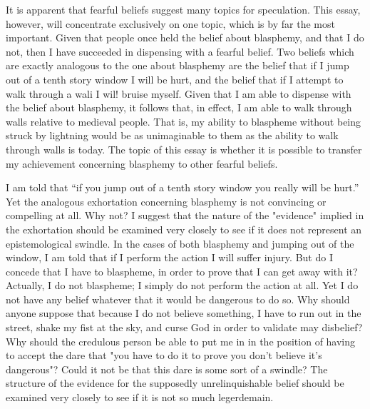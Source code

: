 \documentclass[10pt,twoside,draft]{memoir}
\begin{document}
It is apparent that fearful beliefs suggest many topics for speculation. 
This essay, however, will concentrate exclusively on one topic, which is by 
far the most important. Given that people once held the belief about 
blasphemy, and that I do not, then I have succeeded in dispensing with a 
fearful belief. Two beliefs which are exactly analogous to the one about 
blasphemy are the belief that if I jump out of a tenth story window I will be 
hurt, and the belief that if I attempt to walk through a wali I wil! bruise 
myself. Given that I am able to dispense with the belief about blasphemy, it 
follows that, in effect, I am able to walk through walls relative to medieval 
people. That is, my ability to blaspheme without being struck by lightning 
would be as unimaginable to them as the ability to walk through walls is 
today. The topic of this essay is whether it is possible to transfer my 
achievement concerning blasphemy to other fearful beliefs. 

\visbreak

I am told that \enquote{if you jump out of a tenth story window you really will 
be hurt.} Yet the analogous exhortation concerning blasphemy is not 
convincing or compelling at all. Why not? I suggest that the nature of the 
"evidence" implied in the exhortation should be examined very closely to 
see if it does not represent an epistemological swindle. In the cases of both 
blasphemy and jumping out of the window, I am told that if I perform the 
action I will suffer injury. But do I concede that I have to blaspheme, in 
order to prove that I can get away with it? Actually, I do not blaspheme; I 
simply do not perform the action at all. Yet I do not have any belief 
whatever that it would be dangerous to do so. Why should anyone suppose 
that because I do not believe something, I have to run out in the street, 
shake my fist at the sky, and curse God in order to validate may disbelief? 
Why should the credulous person be able to put me in in the position of 
having to accept the dare that "you have to do it to prove you don't believe 
it's dangerous"? Could it not be that this dare is some sort of a swindle? 
The structure of the evidence for the supposedly unrelinquishable belief 
should be examined very closely to see if it is not so much legerdemain. 
\end{document}

